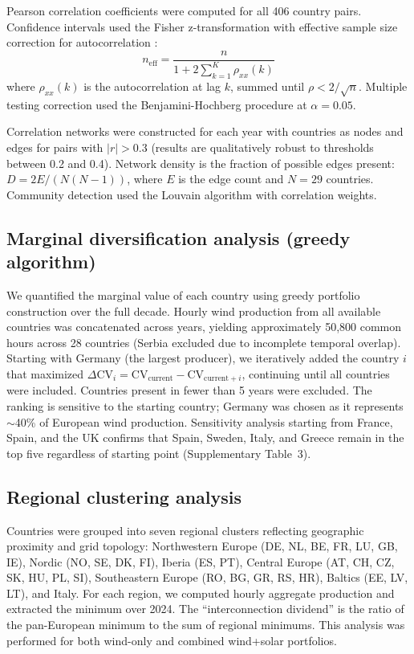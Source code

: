 \documentclass[sn-nature]{sn-jnl}%
\begin{document}
Pearson correlation coefficients were computed for all 406 country pairs. Confidence intervals used the Fisher z-transformation with effective sample size correction for autocorrelation \cite{bayley1946}:
\begin{equation}
    n_{\text{eff}} = \frac{n}{1 + 2\sum_{k=1}^{K} \rho_{xx}(k)}
\end{equation}
where $\rho_{xx}(k)$ is the autocorrelation at lag $k$, summed until $\rho < 2/\sqrt{n}$. Multiple testing correction used the Benjamini-Hochberg procedure at $\alpha = 0.05$.

Correlation networks were constructed for each year with countries as nodes and edges for pairs with $|r| > 0.3$ (results are qualitatively robust to thresholds between 0.2 and 0.4). Network density is the fraction of possible edges present: $D = 2E / (N(N-1))$, where $E$ is the edge count and $N = 29$ countries. Community detection used the Louvain algorithm \cite{blondel2008} with correlation weights.

\subsection{Marginal diversification analysis (greedy algorithm)}

We quantified the marginal value of each country using greedy portfolio construction over the full decade. Hourly wind production from all available countries was concatenated across years, yielding approximately 50,800 common hours across 28 countries (Serbia excluded due to incomplete temporal overlap). Starting with Germany (the largest producer), we iteratively added the country $i$ that maximized $\Delta\text{CV}_i = \text{CV}_{\text{current}} - \text{CV}_{\text{current} + i}$, continuing until all countries were included. Countries present in fewer than 5 years were excluded. The ranking is sensitive to the starting country; Germany was chosen as it represents $\sim$40\% of European wind production. Sensitivity analysis starting from France, Spain, and the UK confirms that Spain, Sweden, Italy, and Greece remain in the top five regardless of starting point (Supplementary Table~3).

\subsection{Regional clustering analysis}

Countries were grouped into seven regional clusters reflecting geographic proximity and grid topology: Northwestern Europe (DE, NL, BE, FR, LU, GB, IE), Nordic (NO, SE, DK, FI), Iberia (ES, PT), Central Europe (AT, CH, CZ, SK, HU, PL, SI), Southeastern Europe (RO, BG, GR, RS, HR), Baltics (EE, LV, LT), and Italy. For each region, we computed hourly aggregate production and extracted the minimum over 2024. The ``interconnection dividend'' is the ratio of the pan-European minimum to the sum of regional minimums. This analysis was performed for both wind-only and combined wind+solar portfolios.
\end{document}
